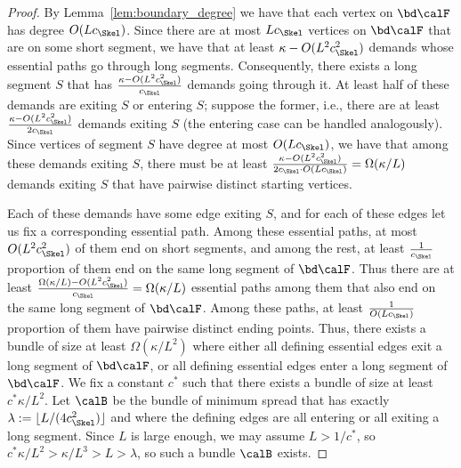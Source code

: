 \begin{proof}
By Lemma~\ref{lem:boundary_degree} we have that each vertex on $\bd\calF$ has degree $O(Lc_\Skel)$. Since there are at most $Lc_\Skel$ vertices on $\bd \calF$ that are on some short segment, we have that at least $\kappa-O(L^2c^2_\Skel)$ demands whose essential paths go through long segments. Consequently, there exists a long segment $S$ that has $\frac{\kappa-O(L^2c^2_\Skel)}{c_\Skel}$ demands going through it. At least half of these demands are exiting $S$ or entering $S$; suppose the former, i.e., there are at least $\frac{\kappa-O(L^2c^2_\Skel)}{2c_\Skel}$ demands exiting $S$ (the entering case can be handled analogously). Since vertices of segment $S$ have degree at most $O(Lc_\Skel)$, we have that among these demands exiting $S$, there must be at least $\frac{\kappa-O(L^2c^2_\Skel)}{2c_\Skel\cdot O(Lc_\Skel)}=\Omega(\kappa/L)$ demands exiting $S$ that have pairwise distinct starting vertices.

Each of these demands have some edge exiting $S$, and for each of these edges let us fix a corresponding essential path. Among these essential paths, at most $O(L^2c^2_\Skel)$ of them end on short segments, and among the rest, at least $\frac{1}{c_\Skel}$ proportion of them end on the same long segment of $\bd\calF$. Thus there are at least 
$\frac{\Omega(\kappa/L)-O(L^2c^2_\Skel)}{c_\Skel}=\Omega(\kappa/L)$
essential paths among them that also end on the same long segment of $\bd \calF$. Among these paths, at least $\frac{1}{O(Lc_\Skel)}$ proportion of them have pairwise distinct ending points. Thus, there exists a bundle of size at least $\Omega(\kappa/L^2)$ where either all defining essential edges exit a long segment of $\bd \calF$, or all defining essential edges enter a long segment of $\bd \calF$. We fix a constant $c^*$ such that there exists a bundle of size at least $c^*\kappa/L^2$. Let $\calB$ be the bundle of minimum spread that has exactly $\lambda:=\lfloor L/(4c^2_\Skel)\rfloor$ and where the defining edges are all entering or all exiting a long segment.  Since $L$ is large enough, we may assume $L>1/c^*$, so $c^*\kappa/L^2>\kappa/L^3>L>\lambda$, so such a bundle $\calB$ exists.


\end{proof}
